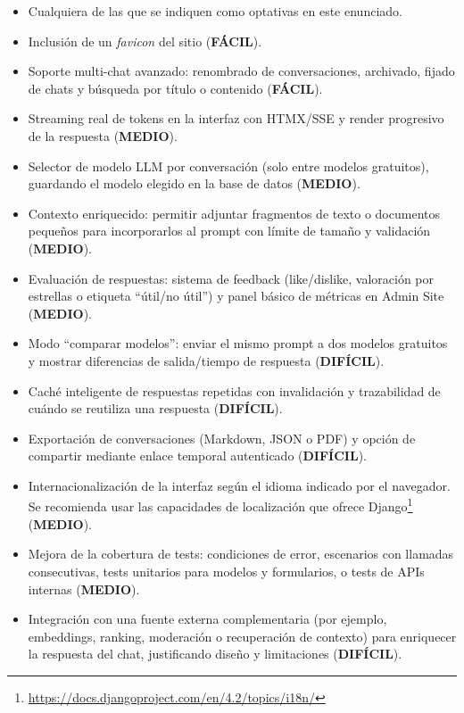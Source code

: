 \begin{itemize}
\item Cualquiera de las que se indiquen como optativas en este enunciado.

\item Inclusión de un \emph{favicon} del sitio (\textbf{FÁCIL}).

\item Soporte multi-chat avanzado: renombrado de conversaciones, archivado, fijado de chats y búsqueda por título o contenido (\textbf{FÁCIL}).

\item Streaming real de tokens en la interfaz con HTMX/SSE y render progresivo de la respuesta (\textbf{MEDIO}).

\item Selector de modelo LLM por conversación (solo entre modelos gratuitos), guardando el modelo elegido en la base de datos (\textbf{MEDIO}).

\item Contexto enriquecido: permitir adjuntar fragmentos de texto o documentos pequeños para incorporarlos al prompt con límite de tamaño y validación (\textbf{MEDIO}).

\item Evaluación de respuestas: sistema de feedback (like/dislike, valoración por estrellas o etiqueta ``útil/no útil'') y panel básico de métricas en Admin Site (\textbf{MEDIO}).

\item Modo ``comparar modelos'': enviar el mismo prompt a dos modelos gratuitos y mostrar diferencias de salida/tiempo de respuesta (\textbf{DIFÍCIL}).

\item Caché inteligente de respuestas repetidas con invalidación y trazabilidad de cuándo se reutiliza una respuesta (\textbf{DIFÍCIL}).

\item Exportación de conversaciones (Markdown, JSON o PDF) y opción de compartir mediante enlace temporal autenticado (\textbf{DIFÍCIL}).

\item Internacionalización de la interfaz según el idioma indicado por el navegador. Se recomienda usar las capacidades de localización que ofrece Django\footnote{\url{https://docs.djangoproject.com/en/4.2/topics/i18n/}} (\textbf{MEDIO}).

\item Mejora de la cobertura de tests: condiciones de error, escenarios con llamadas consecutivas, tests unitarios para modelos y formularios, o tests de APIs internas (\textbf{MEDIO}).

\item Integración con una fuente externa complementaria (por ejemplo, embeddings, ranking, moderación o recuperación de contexto) para enriquecer la respuesta del chat, justificando diseño y limitaciones (\textbf{DIFÍCIL}).
\end{itemize}

